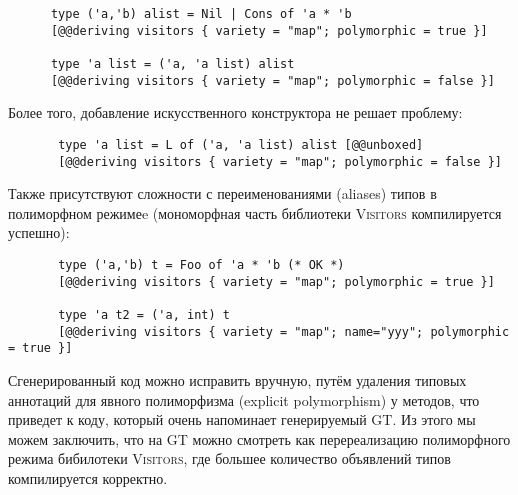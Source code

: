 \begin{itemize}
   \begin{lstlisting}
      type ('a,'b) alist = Nil | Cons of 'a * 'b
      [@@deriving visitors { variety = "map"; polymorphic = true }]

      type 'a list = ('a, 'a list) alist
      [@@deriving visitors { variety = "map"; polymorphic = false }]
   \end{lstlisting}
   
   Более того, добавление искусственного конструктора не решает проблему:
   
    \begin{lstlisting}
       type 'a list = L of ('a, 'a list) alist [@@unboxed]
       [@@deriving visitors { variety = "map"; polymorphic = false }]
    \end{lstlisting}
    
    Также присутствуют сложности с переименованиями (aliases) типов в полиморфном режимеe (мономорфная часть библиотеки \textsc{Visitors} компилируется успешно):
    
    \begin{lstlisting}
       type ('a,'b) t = Foo of 'a * 'b (* OK *)
       [@@deriving visitors { variety = "map"; polymorphic = true }]
       
       type 'a t2 = ('a, int) t
       [@@deriving visitors { variety = "map"; name="yyy"; polymorphic = true }]
    \end{lstlisting}
    
    Сгенерированный код можно исправить вручную, путём удаления типовых аннотаций для явного полиморфизма (explicit polymorphism) у методов, что приведет к коду, который очень напоминает генерируемый  \textsc{GT}. Из этого мы можем заключить, что на \textsc{GT} можно смотреть как перереализацию полиморфного режима бибилотеки  \textsc{Visitors}, где большее количество объявлений типов компилируется корректно.
    
\end{itemize}
